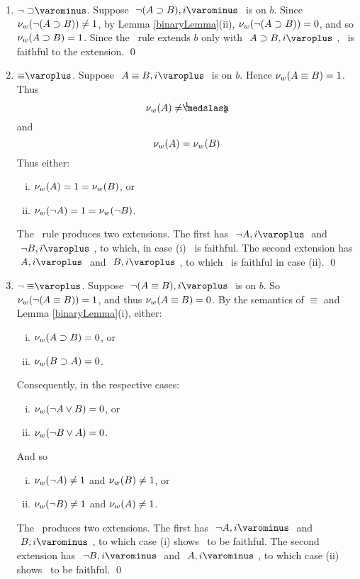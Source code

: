 \begin{proof*}
\begin{enumerate}
		\item $\uRule{ \neg\supset }$. Suppose $ \like{ \uNode{ \neg (A \supset B) }{ i } } $ is on $ b $.
								Since $ \mathcal{\nu}_{ w }({ \neg (A \supset B ) }) \neq 1 $, by Lemma \ref{binaryLemma}(ii), $ \mathcal{\nu}_{ w }({ \neg (A \supset B ) }) = 0 $,
								and so $ \mathcal{\nu}_{ w }({ A \supset B }) = 1 $.
								Since the \uRule{ \neg \supset }\ rule extends $b$ only with $ \like{ \dNodei{ A \supset B }} $,
								\Model\ is faithful to the extension.
								\qed

		\item $\dRule{ \equiv }$. 	Suppose $ \like{ \dNode{ A \equiv B }{ i } } $ is on $ b $.
								Hence $ \mathcal{\nu}_{ w }({ A \equiv B }) = 1 $. 
								Thus
								\[ \Valww{ A } \neq \oneHalf \]
								and
								\[ \mathcal{\nu}_{ w }({ A }) = \mathcal{\nu}_{ w }({ B }) \]
								Thus either:
								\begin{enumerate}[(i)]
									\item $ \mathcal{\nu}_{ w }({ A }) = 1 = \mathcal{\nu}_{ w }({ B }) $, or
									\item $ \mathcal{\nu}_{ w }({ \neg A }) = 1 = \mathcal{\nu}_{ w }({ \neg B }) $.
								\end{enumerate}
								The \dRule{ \equiv }\ rule produces two extensions. The first has $ \like{ \dNodei{ \neg A }} $ and $ \like{ \dNodei{ \neg B }} $,
								to which, in case (i) \Model\ is faithful. 
								The second extension has $ \like{ \dNodei{A}} $ and $ \like{ \dNodei{B}} $, to which \Model\ is faithful in case (ii).
								\qed

		\item $\dRule{ \neg\equiv }$. Suppose $ \like{ \dNode{ \neg (A \equiv B) }{ i } } $ is on $ b $.
								So $ \mathcal{\nu}_{ w }({ \neg (A \equiv B) }) = 1 $, and thus $ \mathcal{\nu}_{ w }({ A \equiv B }) = 0 $.
								By the semantics of $\equiv$ and Lemma \ref{binaryLemma}(i), either:
								\begin{enumerate}[(i)]
									\item $ \mathcal{\nu}_{ w }({A \supset B}) = 0 $, or
									\item $ \mathcal{\nu}_{ w }({B \supset A}) = 0 $.
								\end{enumerate}
								Consequently, in the respective cases:
								\begin{enumerate}[(i)]
									\item $ \mathcal{\nu}_{ w }({ \neg A \vee B }) = 0 $, or
									\item $ \mathcal{\nu}_{ w }({ \neg B \vee A }) = 0 $.
								\end{enumerate}
								And so
								\begin{enumerate}[(i)]
									\item $ \mathcal{\nu}_{ w }({ \neg A }) \neq 1 $ and $ \mathcal{\nu}_{ w }({ B }) \neq 1 $, or
									\item $ \mathcal{\nu}_{ w }({ \neg B }) \neq 1 $ and $ \mathcal{\nu}_{ w }({ A }) \neq 1 $.
								\end{enumerate}
								The \dRule{ \neg \equiv }\ produces two extensions. The first has $ \like{ \uNodei{ \neg A } } $ and $ \like{ \uNodei{ B }} $,
								to which case (i) shows \Model\ to be faithful.
								The second extension has $ \like{ \uNodei{ \neg B} } $ and $ \like{ \uNodei{ A } } $, to which case (ii) shows \Model\ to be faithful.
								\qed
								


\end{enumerate}
\end{proof*}
